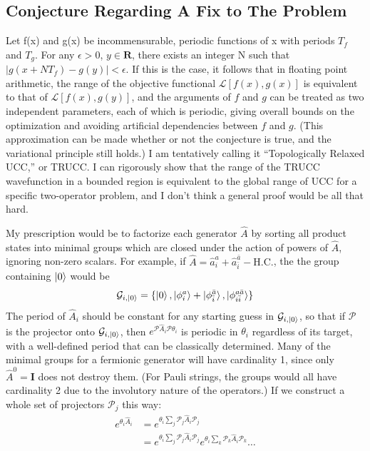 \documentclass{article}
\begin{document}
\subsection*{Conjecture Regarding A Fix to The Problem}
Let f(x) and g(x) be incommensurable, periodic functions of x with periods $T_f$ and $T_g$.  For any $\epsilon>0$, $y\in \mathbf{R}$, there exists an integer N such that $|g(x+NT_f)-g(y)|<\epsilon$.  If this is the case, it follows that in floating point arithmetic, the range of the objective functional $\mathcal{L}\left[f(x),g(x)\right]$ is equivalent to that of $\mathcal{L}\left[f(x),g(y)\right]$, and the arguments of $f$ and $g$ can be treated as two independent parameters, each of which is periodic, giving overall bounds on the optimization and avoiding artificial dependencies between $f$ and $g$.  (This approximation can be made whether or not the conjecture is true, and the variational principle still holds.)  I am tentatively calling it ``Topologically Relaxed UCC,'' or TRUCC.  I can rigorously show that the range of the TRUCC wavefunction in a bounded region is equivalent to the global range of UCC for a specific two-operator problem, and I don't think a general proof would be all that hard.\\
\par
My prescription would be to factorize each generator $\hat{A}$ by sorting all product states into minimal groups which are closed under the action of powers of $\hat{A}$, ignoring non-zero scalars.  For example, if $\hat{A} = \hat{a}_i^a +\hat{a}_{\bar{i}}^{\bar{a}}-\text{H.C.}$, the the group containing $\ket{0}$ would be 
\begin{equation}
\mathcal{G}_{i,\ket{0}} = \{\ket{0},\ket{\phi_i^a}+\ket{\phi_{\bar{i}}^{\bar{a}}},\ket{\phi_{i\bar{i}}^{a\bar{a}}}\} 
\end{equation}
The period of $\hat{A}_i$ should be constant for any starting guess in $\mathcal{G}_{i,{\ket{0}}}$, so that if $\mathcal{P}$ is the projector onto $\mathcal{G}_{i,{\ket{0}}}$, then $e^{\mathcal{P}\hat{A}_i\mathcal{P}\theta_i}$ is periodic in $\theta_i$ regardless of its target, with a well-defined period that can be classically determined.  Many of the minimal groups for a fermionic generator will have cardinality 1, since only $\hat{A}^0=\mathbf{I}$ does not destroy them.  (For Pauli strings, the groups would all have cardinality 2 due to the involutory nature of the operators.)  If we construct a whole set of projectors $\mathcal{P}_j$ this way:
\begin{align}
e^{\theta_i\hat{A}_i} &= e^{\theta_i\sum_j \mathcal{P}_j\hat{A}_i\mathcal{P}_j}\\
&= e^{\theta_i\sum_j \mathcal{P}_j\hat{A}_i\mathcal{P}_j}e^{\theta_i\sum_k \mathcal{P}_k\hat{A}_i\mathcal{P}_k}\dots
\end{align}
\end{document}
